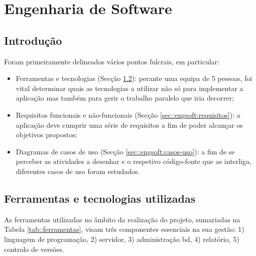 \chapter{Engenharia de Software}
\label{ch::engsoft}


\section{Introdução}
\label{sec::engsoft:intro}

Foram primeiramente delineados vários pontos fulcrais, em particular:

\begin{itemize}
    \item Ferramentas e tecnologias (Secção \ref{sec::engsoft:tecnologia}): perante uma equipa de 5 pessoas, foi vital determinar quais as tecnologias a utilizar não só para implementar a aplicação mas também para gerir o trabalho paralelo que iria decorrer;
    \item Requisitos funcionais e não-funcionais (Secção \ref{sec::engsoft:requisitos}): a aplicação deve cumprir uma série de requisitos a fim de poder alcançar os objetivos propostos;
    \item Diagramas de casos de uso (Secção \ref{sec::engsoft:casos-uso}): a fim de se perceber as atividades a desenhar e o respetivo código-fonte que as interliga, diferentes casos de uso foram estudados.
\end{itemize}


\section{Ferramentas e tecnologias utilizadas}
\label{sec::engsoft:tecnologia}

As ferramentas utilizadas no âmbito da realização do projeto, sumariadas na Tabela \ref{tab::ferramentas}, visam três componentes essenciais na sua gestão: 1) linguagem de programação, 2) servidor, 3) administração bd, 4) relatório, 5) controlo de versões.


